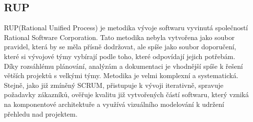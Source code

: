\documentclass[czech,DP]{thesiskiv}
\begin{document}
\subsection{RUP}\label{sec:rup}
RUP(Rational Unified Process) je metodika vývoje softwaru vyvinutá společností Rational Software Corporation. Tato metodika nebyla vytvořena jako soubor pravidel, která by se měla přísně dodržovat, ale spíše jako soubor doporučení, které si vývojové týmy vybírají podle toho, které odpovídají jejich potřebám. Díky rozsáhlému plánování, analýzám a dokumentaci je vhodnější spíše k řešení větších projektů s velkými týmy. Metodika je velmi komplexní a systematická. Stejně, jako již zmíněný SCRUM, přistupuje k vývoji iterativně, spravuje požadavky zákazníků, ověřuje kvalitu již vytvořených částí softwaru, který vzniká na komponentové architektuře a využívá vizuálního modelování k udržení přehledu nad projektem. \cite{RUPbook}
\end{document}

